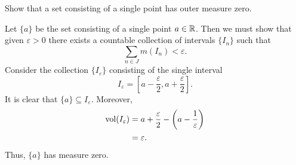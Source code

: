 \begin{problem}
  Show that a set consisting of a single point has outer measure zero.
\end{problem}
\begin{solution}
  Let \(\{a\}\) be the set consisting of a single point \(a\in\mathbb{R}\). Then
  we must show that given \(\varepsilon>0\) there exists a countable
  collection of intervals \(\{I_n\}\) such that
  \[
    \sum_{n\in J} m(I_n)<\varepsilon.
  \]
  Consider the collection \(\{I_\varepsilon\}\) consisting of the single
  interval
  \[
    I_\varepsilon=
    \left[a-\frac{\varepsilon}{2},a+\frac{\varepsilon}{2}\right].
  \]
  It is clear that \(\{a\}\subseteq I_\varepsilon\). Moreover,
  \begin{align*}
    \operatorname{vol}(I_\varepsilon)
    &=a+\frac{\varepsilon}{2}-\left(a-\frac{1}{\varepsilon}\right)\\
    &=\varepsilon.
  \end{align*}
  Thus, \(\{a\}\) has measure zero.
\end{solution}

